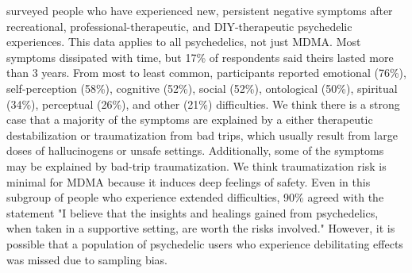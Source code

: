 \documentclass[12pt,letterpaper]{book}
\begin{document}
\textcite{evans2023extended} surveyed people who have experienced new, persistent negative symptoms after recreational, professional-therapeutic, and DIY-therapeutic psychedelic experiences. This data applies to all psychedelics, not just MDMA. Most symptoms dissipated with time, but 17\% of respondents said theirs lasted more than 3 years. From most to least common, participants reported emotional (76\%), self-perception (58\%), cognitive (52\%), social (52\%), ontological (50\%), spiritual (34\%), perceptual (26\%), and other (21\%) difficulties. We think there is a strong case that a majority of the symptoms are explained by a either therapeutic destabilization or traumatization from bad trips, which usually result from large doses of hallucinogens or unsafe settings. Additionally, some of the symptoms may be explained by bad-trip traumatization. We think traumatization risk is minimal for MDMA because it induces deep feelings of safety. Even in this subgroup of people who experience extended difficulties, 90\% agreed with the statement "I believe that the insights and healings gained from psychedelics, when taken in a supportive setting, are worth the risks involved." However, it is possible that a population of psychedelic users who experience debilitating effects was missed due to sampling bias.

\vspace{\baselineskip}
\end{document}
